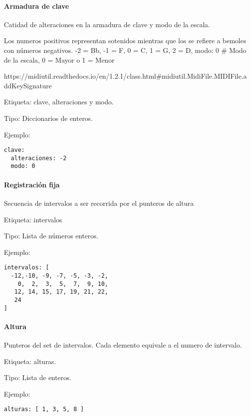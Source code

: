 \documentclass[]{article}
\let\oldparagraph\paragraph
\renewcommand{\paragraph}[1]{\oldparagraph{#1}\mbox{}}
\begin{document}
\hypertarget{armadura-de-clave}{%
\paragraph{Armadura de clave}\label{armadura-de-clave}}

Catidad de alteraciones en la armadura de clave y modo de la escala.

Los numeros positivos representan sotenidos mientras que los se refiere
a bemoles con números negativos. -2 = Bb, -1 = F, 0 = C, 1 = G, 2 = D,
modo: 0 \# Modo de la escala, 0 = Mayor o 1 = Menor

https://midiutil.readthedocs.io/en/1.2.1/class.html\#midiutil.MidiFile.MIDIFile.addKeySignature

Etiqueta: clave, alteraciones y modo.

Tipo: Diccionarios de enteros.

Ejemplo:

\begin{Verbatim}
clave:
  alteraciones: -2
  modo: 0 
\end{Verbatim}

\hypertarget{registraciuxf3n-fija}{%
\paragraph{Registración fija}\label{registraciuxf3n-fija}}

Secuencia de intervalos a ser recorrida por el punteros de altura

Etiqueta: intervalos

Tipo: Lista de números enteros.

Ejemplo:

\begin{Verbatim}
intervalos: [ 
  -12,-10, -9, -7, -5, -3, -2,
    0,  2,  3,  5,  7,  9, 10,
   12, 14, 15, 17, 19, 21, 22,
   24
]
\end{Verbatim}

\hypertarget{altura}{%
\paragraph{Altura}\label{altura}}

Punteros del set de intervalos. Cada elemento equivale a el numero de
intervalo.

Etiqueta: alturas.

Tipo: Lista de enteros.

Ejemplo:

\begin{Verbatim}
alturas: [ 1, 3, 5, 8 ] 
\end{Verbatim}
\end{document}
